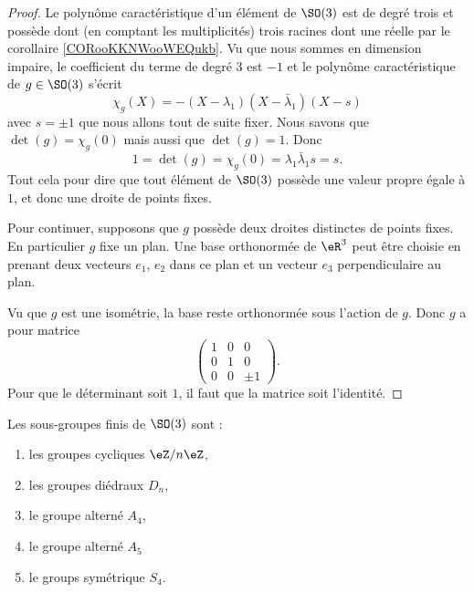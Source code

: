 \begin{proof}
    Le polynôme caractéristique d'un élément de \( \SO(3)\) est de degré trois et possède dont (en comptant les multiplicités) trois racines dont une réelle par le corollaire \ref{CORooKKNWooWEQukb}. Vu que nous sommes en dimension impaire, le coefficient du terme de degré \( 3\) est \( -1\) et le polynôme caractéristique de \( g\in\SO(3)\) s'écrit
    \begin{equation}
        \chi_g(X)=-(X-\lambda_1)(X-\bar\lambda_1)(X-s)
    \end{equation}
    avec \( s=\pm1 \) que nous allons tout de suite fixer. Nous savons que \( \det(g)=\chi_g(0)\) mais aussi que \( \det(g)=1\). Donc
    \begin{equation}
        1=\det(g)=\chi_g(0)=\lambda_1\bar\lambda_1 s=s.
    \end{equation}
    Tout cela pour dire que tout élément de \( \SO(3)\) possède une valeur propre égale à \( 1\), et donc une droite de points fixes.

    Pour continuer, supposons que \( g\) possède deux droites distinctes de points fixes. En particulier \( g\) fixe un plan. Une base orthonormée de \( \eR^3\) peut être choisie en prenant deux vecteurs \( e_1\), \( e_2\) dans ce plan et un vecteur \( e_3\) perpendiculaire au plan.

    Vu que \( g\) est une isométrie, la base reste orthonormée sous l'action de \( g\). Donc \( g\) a pour matrice
    \begin{equation}
        \begin{pmatrix}
            1    &   0    &   0    \\
            0    &   1    &   0    \\
            0    &   0    &   \pm 1
        \end{pmatrix}.
    \end{equation}
    Pour que le déterminant soit \( 1\), il faut que la matrice soit l'identité.
\end{proof}

\begin{proposition}
    Les sous-groupes finis de \( \SO(3)\) sont :
    \begin{multicols}{2}
        \begin{enumerate}
            \item
                les groupes cycliques \( \eZ/n\eZ\),
            \item
                les groupes diédraux \( D_n\),
            \item
                le groupe alterné \( A_4\),
            \item
                le groupe alterné \( A_5\)
            \item
                le groups symétrique \( S_4\).
        \end{enumerate}
    \end{multicols}
\end{proposition}

